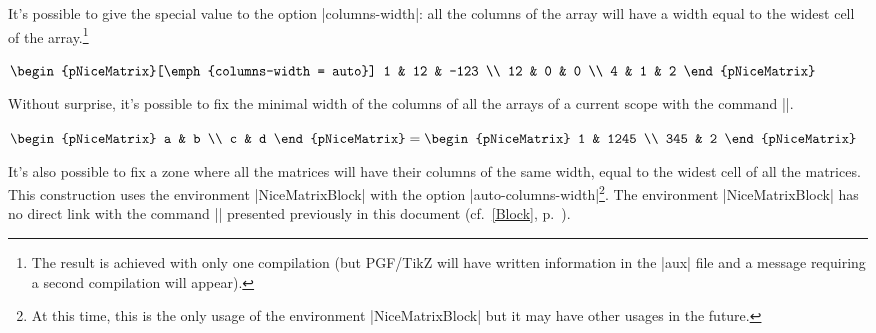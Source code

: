 \documentclass[dvipsnames]{article}
\begin{document}
\bigskip
It's possible to give the special value  to the option
|columns-width|: all the columns of the array will have a width equal to the
widest cell of the array.\footnote{The result is achieved with only one
  compilation (but PGF/TikZ will have written information in the |aux| file and
  a message requiring a second compilation will appear).}

\nobreak
\medskip
\begin{Code}[width=10cm,show-output,no-cell-nodes]
$\begin{pNiceMatrix}[\emph{columns-width = auto}]
  1  & 12 & -123 \\
  12 & 0  & 0    \\
  4  & 1  & 2 
\end{pNiceMatrix}$
\end{Code}

\bigskip
Without surprise, it's possible to fix the minimal width of the columns of all
the arrays of a current scope with the command
|\NiceMatrixOptions|.

\nobreak
\medskip
\begin{Code}[width=8.5cm,show-output]
\emph{}
$\begin{pNiceMatrix}
a & b \\ c & d 
\end{pNiceMatrix}
= 
\begin{pNiceMatrix}
1   & 1245 \\ 345 & 2 
\end{pNiceMatrix}$
\end{Code}


\bigskip
{}
It's also possible to fix a zone where all the matrices will have their
columns of the same width, equal to the widest cell of all the matrices. This
construction uses the environment |{NiceMatrixBlock}| with the option
|auto-columns-width|\footnote{At this time, this is the only usage of the
environment |{NiceMatrixBlock}| but it may have other usages in the future.}.
The environment |{NiceMatrixBlock}| has no direct link with the command
|\Block| presented previously in this document (cf.~\ref{Block}, p.~\pageref{Block}).

\medskip
{}
\end{document}
